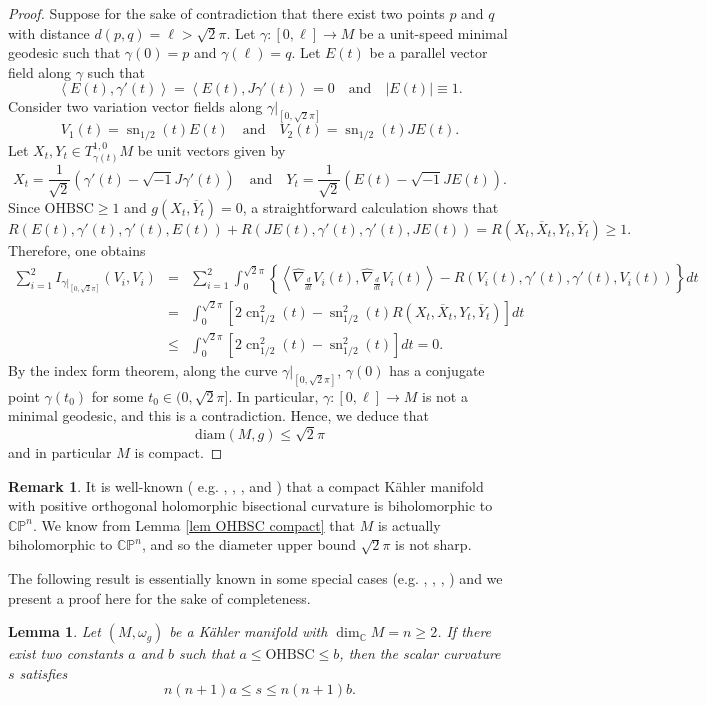 \documentclass[12pt]{amsart}
\theoremstyle{plain}
\newtheorem{lemma}[thm]{Lemma}
\theoremstyle{definition}
\newtheorem{remark}[thm]{Remark}
\newcommand{\bproof}{\begin{proof}}
\newcommand{\eproof}{\end{proof}}
\newcommand{\bremark}{\begin{remark}}
\newcommand{\eremark}{\end{remark}}
\newcommand{\elemma}{\end{lemma}}
\newcommand{\blemma}{\begin{lemma}}
\newcommand{\sq}{\sqrt{-1}}
\renewcommand{\bar}{\overline}
\newcommand{\ee}{\end{eqnarray*}}
\newcommand{\be}{\begin{eqnarray*}}
\renewcommand{\hat}{\widehat}
\newcommand{\qtq}[1]{\quad\mbox{#1}\quad}
\renewcommand{\>}{\rightarrow}
\newcommand{\C}{{\mathbb C}}
\renewcommand{\P}{{\mathbb P}}
\newcommand{\LL}{\left\langle}
\newcommand{\RL}{\right\rangle}
\newcommand{\om}{\omega}
\numberwithin{equation}{section} %
\begin{document}
\bproof  Suppose for the sake of contradiction  that there exist two points $p$ and $q$ with distance $d(p,q)=\ell>\sqrt 2 \pi$. 
Let $\gamma:[0,\ell]\to M$ be a unit-speed minimal geodesic such that $\gamma(0)=p$ and $\gamma(\ell)=q$. 
Let $E(t)$ be a parallel vector field along $\gamma$ such that 
$$\LL E(t),\gamma'(t)\RL=\LL E(t),J\gamma'(t)\RL=0\qtq{and} |E(t)|\equiv 1.$$
Consider two variation vector fields along $\gamma|_{[0,\sqrt{2}\pi]}$
$$V_1(t)= \operatorname{sn}_{1/2}(t)E(t)\qtq{and}V_2(t)= \operatorname{sn}_{1/2}(t)JE(t).$$
Let  $X_t,Y_t\in T^{1,0}_{\gamma(t)}M$ be unit vectors given by
\[ 
X_t=\frac{1}{\sqrt{2}}\left(\gamma'(t)-\sq J\gamma'(t)\right)
\qtq{and}
Y_t=\frac{1}{\sqrt{2}}\left(E(t)-\sq JE(t)\right).
\]
Since $\mathrm{OHBSC}\ge 1$ and $g(X_t,\bar Y_t)=0$, a straightforward calculation shows that 
\[ 
R(E(t),\gamma'(t),\gamma'(t),E(t))
+R(JE(t),\gamma'(t),\gamma'(t),JE(t))=R(X_t,\bar X_t,Y_t,\bar Y_t)\ge 1.
\] 
Therefore, one obtains
\be 
\sum_{i=1}^{2} I_{\gamma|_{[0,\sqrt 2\pi]}}(V_{i},V_{i})
&=& \sum_{i=1}^{2}\int_0^{\sqrt{2}\pi} \left\{\LL \hat\nabla_{\frac{d}{dt}}V_{i}(t),\hat\nabla_{\frac{d}{dt}}V_{i}(t)\RL-R(V_{i}(t),\gamma'(t),\gamma'(t),V_{i}(t))\right\} dt\\
&=& \int_0^{\sqrt{2}\pi}\left[ 2\operatorname{cn}_{1/2}^2(t)-\operatorname{sn}_{1/2}^2(t)R(X_t,\bar X_t,Y_t,\bar Y_t)\right]dt\\
&\le& \int_0^{\sqrt{2}\pi} \left[2\operatorname{cn}_{1/2}^2(t) -\operatorname{sn}_{1/2}^2(t) \right]dt
= 0.
\ee 
By the index form theorem,  along the curve $\gamma|_{[0,\sqrt{2}\pi]}$, $\gamma(0)$ has a conjugate point $\gamma(t_0)$ for some $t_0\in (0,\sqrt 2 \pi]$. In particular,  $\gamma:[0,\ell]\>M$ is not a minimal geodesic,
and this is a contradiction.
Hence, we deduce that $$\mathrm{diam}(M,g)\leq \sqrt{2}\pi$$ and in particular $M$ is compact.
\eproof

\bremark It is well-known ( e.g. \cite{Mok88}, \cite{Che07}, \cite{GZ10}, \cite{CT12} and \cite{FLW17}) that  a compact K\"ahler manifold with positive orthogonal holomorphic bisectional curvature is biholomorphic to $\C\P^n$. We know from Lemma \ref{lem OHBSC compact} that $M$ is actually biholomorphic to $\C\P^n$,  and so  the diameter upper bound $\sqrt 2\pi$ is not sharp. 
\eremark 


\noindent 
The following result is essentially known in some special cases (e.g. \cite{GZ10}, \cite{CT12}, \cite{FLW17}, \cite{NZ18}) and we present a proof here for the sake of completeness.
\blemma \label{prop OHBSC scalar}
Let $(M,\om_g)$ be a K\"ahler manifold with $\dim_\C M=n\ge 2$. If there exist two constants $a$ and $b$ such that $a\le \mathrm{OHBSC}\le b$, then  the scalar curvature $s$ satisfies
\[ 
n(n+1)a\le s\le n(n+1)b.
\] 
\elemma
\end{document}

